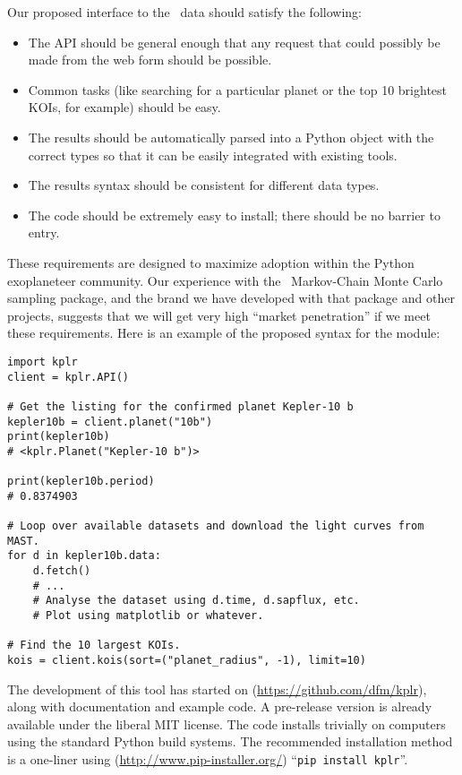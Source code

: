 \documentclass[letterpaper,12pt,preprint]{hack_aastex}
\newcommand{\hurl}[1]{{\scriptsize\url{#1}}}
\newcommand{\emcee}{\package{emcee}}
\begin{document}
Our proposed interface to the \Kepler\ data should satisfy the following:
\begin{itemize}
\item The API should be general enough that any request that could
possibly be made from the web form should be possible.
\item Common tasks (like searching for a particular planet or the top 10
brightest KOIs, for example) should be easy.
\item The results should be automatically parsed into a Python object with the
correct types so that it can be easily integrated with existing tools.
\item The results syntax should be consistent for different data types.
\item The code should be extremely easy to install; there should be no
barrier to entry.
\end{itemize}
These requirements are designed to maximize adoption within the Python
exoplaneteer community.
Our experience with the \emcee\ Markov-Chain Monte Carlo sampling package,
and the brand we have developed with that package and other projects,
suggests that we will get very high ``market penetration'' if we meet these
requirements.  Here is an example of the proposed syntax for the module:
\begin{lstlisting}
import kplr
client = kplr.API()

# Get the listing for the confirmed planet Kepler-10 b
kepler10b = client.planet("10b")
print(kepler10b)
# <kplr.Planet("Kepler-10 b")>

print(kepler10b.period)
# 0.8374903

# Loop over available datasets and download the light curves from MAST.
for d in kepler10b.data:
    d.fetch()
    # ...
    # Analyse the dataset using d.time, d.sapflux, etc.
    # Plot using matplotlib or whatever.

# Find the 10 largest KOIs.
kois = client.kois(sort=("planet_radius", -1), limit=10)
\end{lstlisting}
The development of this tool has started on 
(\hurl{https://github.com/dfm/kplr}),
along with documentation and example code.
A pre-release version is already available under the liberal MIT
license.
The code installs trivially on computers using the standard Python build
systems. The recommended installation method is a one-liner using 
(\hurl{http://www.pip-installer.org/}) ``\texttt{pip install kplr}''.
\end{document}
